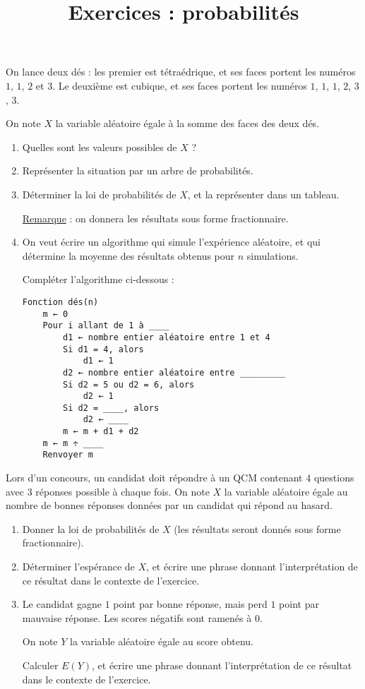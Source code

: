 \documentclass[
	classe=$1^{ere}STI2D$
]{exercice}
\title{Exercices : probabilités}
\begin{document}
\maketitle

\begin{exercice}
	On lance deux dés : les premier est tétraédrique, et ses faces portent les numéros $1$, $1$, $2$ et $3$. Le deuxième est cubique, et ses faces portent les numéros $1$, $1$, $1$, $2$, $3$, $3$.

	On note $X$ la variable aléatoire égale à la somme des faces des deux dés.

	\begin{enumerate}
		\item Quelles sont les valeurs possibles de $X$ ?
		\item Représenter la situation par un arbre de probabilités.
		\item Déterminer la loi de probabilités de $X$, et la représenter dans un tableau.

		      \uline{Remarque} : on donnera les résultats sous forme fractionnaire.
		\item On veut écrire un algorithme qui simule l'expérience aléatoire, et qui détermine la moyenne des résultats obtenus pour $n$ simulations.

		      Compléter l'algorithme ci-dessous :

		      {\begin{lstlisting}[frame=single]
Fonction dés(n)
    m ← 0
    Pour i allant de 1 à ____
        d1 ← nombre entier aléatoire entre 1 et 4
        Si d1 = 4, alors
            d1 ← 1
        d2 ← nombre entier aléatoire entre _________
        Si d2 = 5 ou d2 = 6, alors
            d2 ← 1
        Si d2 = ____, alors
            d2 ← ____
        m ← m + d1 + d2
    m ← m ÷ ____
    Renvoyer m
\end{lstlisting}}
	\end{enumerate}
\end{exercice}

\begin{exercice}
	Lors d'un concours, un candidat doit répondre à un QCM contenant $4$ questions avec $3$ réponses possible à chaque fois. On note $X$ la variable aléatoire égale au nombre de bonnes réponses données par un candidat qui répond au hasard.
	\begin{enumerate}
		\item Donner la loi de probabilités de $X$ (les résultats seront donnés sous forme fractionnaire).
		\item Déterminer l'espérance de $X$, et écrire une phrase donnant l'interprétation de ce résultat dans le contexte de l'exercice.
		\item Le candidat gagne $1$ point par bonne réponse, mais perd $1$ point par mauvaise réponse. Les scores négatifs sont ramenés à $0$.

		      On note $Y$ la variable aléatoire égale au score obtenu.

		      Calculer $E(Y)$, et écrire une phrase donnant l'interprétation de ce résultat dans le contexte de l'exercice.
	\end{enumerate}
\end{exercice}
\end{document}
